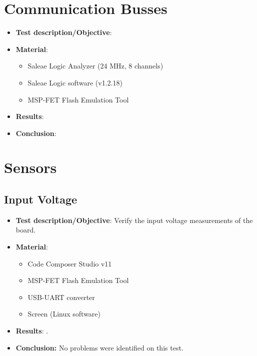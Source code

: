 \section{Communication Busses}

\begin{itemize}
    \item \textbf{Test description/Objective}: %
    \item \textbf{Material}:
        \begin{itemize}
            \item Saleae Logic Analyzer (24 MHz, 8 channels)
            \item Saleae Logic software (v1.2.18)
            \item MSP-FET Flash Emulation Tool
        \end{itemize}
    \item \textbf{Results}: %
    \item \textbf{Conclusion}: %
\end{itemize}

\section{Sensors}

\subsection{Input Voltage}

\begin{itemize}
    \item \textbf{Test description/Objective}: Verify the input voltage measurements of the board.
    \item \textbf{Material}:
        \begin{itemize}
            \item Code Composer Studio v11
            \item MSP-FET Flash Emulation Tool
            \item USB-UART converter
            \item Screen (Linux software)
        \end{itemize}
    \item \textbf{Results}: .
    \item \textbf{Conclusion:} No problems were identified on this test.
\end{itemize}

